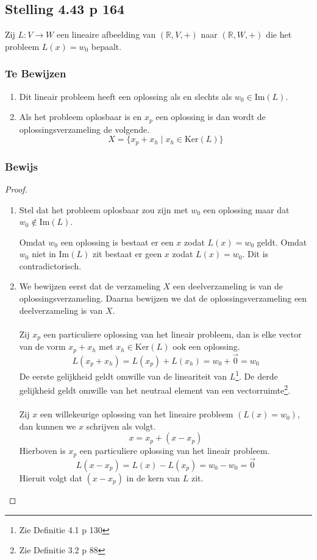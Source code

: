 \documentclass[lineaire_algebra_oplossingen.tex]{subfiles}
\begin{document}
\subsection{Stelling 4.43 p 164}
\label{4.43}
Zij $L:V\rightarrow W$ een lineaire afbeelding van $(\mathbb{R},V,+)$ naar $(\mathbb{R},W,+)$ die het probleem $L(x) = w_0$ bepaalt.

\subsubsection*{Te Bewijzen}
\begin{enumerate}
\item Dit lineair probleem heeft een oplossing als en slechts als $w_0 \in \text{Im}(L)$.

\item
Als het probleem oplosbaar is en $x_p$ een oplossing is dan wordt de oplossingsverzameling de volgende.
\[
X = \{x_p + x_h \mid x_h \in \text{Ker}(L)\}
\]
\end{enumerate}

\subsubsection*{Bewijs}
\begin{proof}~
\begin{enumerate}
\item Stel dat het probleem oplosbaar zou zijn met $w_0$ een oplossing maar dat $w_0 \not\in \text{Im}(L)$.

Omdat $w_0$ een oplossing is bestaat er een $x$ zodat $L(x) = w_0$ geldt. Omdat $w_0$ niet in $\text{Im}(L)$ zit bestaat er geen $x$ zodat $L(x) = w_0$. Dit is contradictorisch.

\item
We bewijzen eerst dat de verzameling $X$ een deelverzameling is van de oplossingsverzameling. Daarna bewijzen we dat de oplossingsverzameling een deelverzameling is van $X$.\\\\
Zij $x_p$ een particuliere oplossing van het lineair probleem, dan is elke vector van de vorm $x_p+x_h$ met $x_h\in \text{Ker}(L)$ ook een oplossing.
\[
L(x_p+x_h)=L(x_p)+L(x_h)=w_0+\vec{0} = w_0
\]
De eerste gelijkheid geldt omwille van de lineariteit van $L$\footnote{Zie Definitie 4.1 p 130}. De derde gelijkheid geldt omwille van het neutraal element van een vectorruimte\footnote{Zie Definitie 3.2 p 88}.\\\\
Zij $x$ een willekeurige oplossing van het lineaire probleem $(L(x)=w_0)$, dan kunnen we $x$ schrijven als volgt.
\[
x = x_p + (x-x_p)
\]
Hierboven is $x_p$ een particuliere oplossing van het lineair probleem.
\[
L(x-x_p) = L(x) - L(x_p) = w_0-w_0=\vec{0}
\]
Hieruit volgt dat $(x-x_p)$ in de kern van $L$ zit.
\end{enumerate}
\end{proof}
\end{document}
